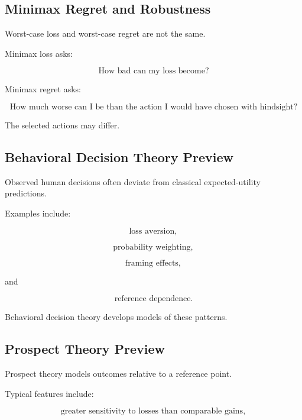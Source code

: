 \subsection{Minimax Regret and Robustness}
\label{subsec:minimax-regret-robustness}

Worst-case loss and worst-case regret are not the same.

Minimax loss asks:

\[
\boxed{
\text{How bad can my loss become?}
}
\]

Minimax regret asks:

\[
\boxed{
\text{How much worse can I be than the action I would have chosen with
hindsight?}
}
\]

The selected actions may differ.

\subsection{Behavioral Decision Theory Preview}
\label{subsec:behavioral-decision-theory}

Observed human decisions often deviate from classical expected-utility
predictions.

Examples include:

\[
\boxed{
\text{loss aversion},
}
\]

\[
\boxed{
\text{probability weighting},
}
\]

\[
\boxed{
\text{framing effects},
}
\]

and

\[
\boxed{
\text{reference dependence}.
}
\]

Behavioral decision theory develops models of these patterns.

\subsection{Prospect Theory Preview}
\label{subsec:prospect-theory-preview}

Prospect theory models outcomes relative to a reference point.

Typical features include:

\[
\boxed{
\text{greater sensitivity to losses than comparable gains},
}
\]


